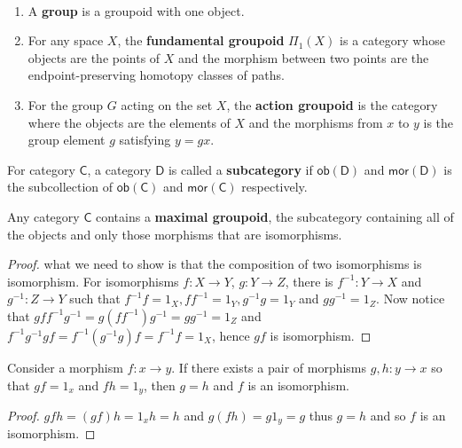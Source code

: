 \begin{exmp}
~\begin{enumerate}
\item A \textbf{group} is a groupoid with one object.
\item For any space $X$, the \textbf{fundamental groupoid} $\Pi_1(X)$ is a category whose objects are the points of $X$ and the morphism between two points are the endpoint-preserving homotopy classes of paths.
\item For the group $G$ acting on the set $X$, the \textbf{action groupoid} is the category where the objects are the elements of $X$ and the morphisms from $x$ to $y$ is the group element $g$ satisfying $y=gx$.
\end{enumerate}
\end{exmp}

\begin{defn} For category $\mathsf{C}$, a category $\mathsf{D}$ is called a \textbf{subcategory} if $\mathsf{ob}(\mathsf{D})$ and $\mathsf{mor}(\mathsf{D})$ is the subcollection of $\mathsf{ob}(\mathsf{C})$ and $\mathsf{mor}(\mathsf{C})$ respectively.
\end{defn}

\begin{lemma} Any category $\mathsf{C}$ contains a \textbf{maximal groupoid}, the subcategory containing all of the objects and only those morphisms that are isomorphisms.
\end{lemma}
\begin{proof} what we need to show is that the composition of two isomorphisms is isomorphism. For isomorphisms $f:X\rightarrow Y$, $g:Y\rightarrow Z$, there is $f^{-1}:Y\rightarrow X$ and $g^{-1}:Z\rightarrow Y$ such that $f^{-1}f=1_X, ff^{-1}=1_Y, g^{-1}g=1_Y$ and $gg^{-1}=1_Z$. Now notice that $gff^{-1}g^{-1}=g(ff^{-1})g^{-1}=gg^{-1}=1_Z$ and $f^{-1}g^{-1}gf=f^{-1}(g^{-1}g)f=f^{-1}f=1_X$, hence $gf$ is isomorphism.
\end{proof}

\begin{prop} Consider a morphism $f:x\rightarrow y$. If there exists a pair of morphisms $g,h:y\rightarrow x$ so that $gf=1_x$ and $fh=1_y$, then $g=h$ and $f$ is an isomorphism.
\end{prop}
\begin{proof}
$gfh=(gf)h=1_x h=h$ and $g(fh)=g1_y=g$ thus $g=h$ and so $f$ is an isomorphism.
\end{proof}

